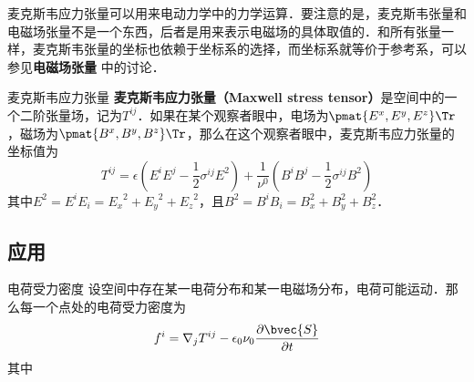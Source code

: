 


麦克斯韦应力张量可以用来电动力学中的力学运算．要注意的是，麦克斯韦张量和电磁场张量不是一个东西，后者是用来表示电磁场的具体取值的．和所有张量一样，麦克斯韦张量的坐标也依赖于坐标系的选择，而坐标系就等价于参考系，可以参见\textbf{电磁场张量} 中的讨论．

\begin{definition}{麦克斯韦应力张量}
\textbf{麦克斯韦应力张量（Maxwell stress tensor）}是空间中的一个二阶张量场，记为$T^{ij}$．如果在某个观察者眼中，电场为$\pmat{E^x, E^y, E^z}\Tr$，磁场为$\pmat{B^x, B^y, B^z}\Tr$，那么在这个观察者眼中，麦克斯韦应力张量的坐标值为
\begin{equation}
T^{ij}=\epsilon(E^iE^j-\frac{1}{2}\sigma^{ij}E^2)+\frac{1}{\nu^0}(B^iB^j-\frac{1}{2}\sigma^{ij}B^2)
\end{equation}
其中$E^2=E^iE_i={E_x}^2+{E_y}^2+{E_z}^2$，且$B^2=B^iB_i=B_x^2+B_y^2+B_z^2$．
\end{definition}


\subsection{应用}

\begin{theorem}{电荷受力密度}
设空间中存在某一电荷分布和某一电磁场分布，电荷可能运动．那么每一个点处的电荷受力密度为
\begin{equation}
f^i=\nabla_jT^{ij}-\epsilon_0\nu_0\frac{\partial\bvec{S}}{\partial t}
\end{equation}
其中
\end{theorem}






